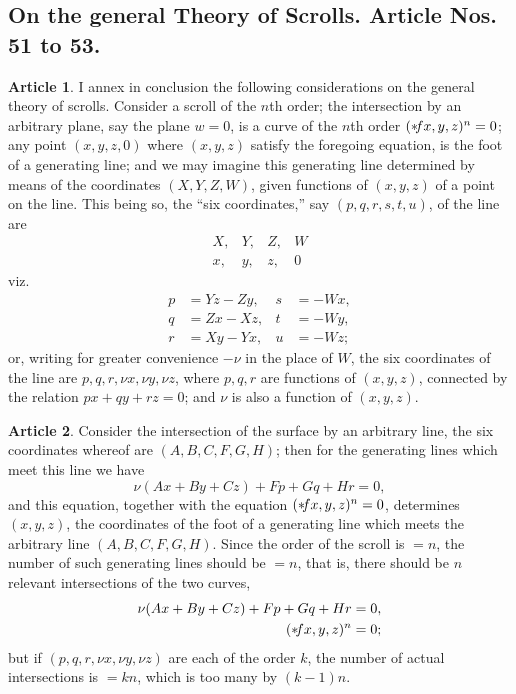 \documentclass[12pt,a4paper]{article}
\theoremstyle{definition}
\newtheorem{art}{Article}[section]
\begin{document}
\subsection*{On the general Theory of Scrolls. Article Nos. 51 to 53.}

\begin{art}
I annex in conclusion the following considerations on the general theory of scrolls. Consider a scroll of the $n$th order; the intersection by an arbitrary plane, say the plane $w = 0$, is a curve of the $n$th order $(* \hspace{-2pt} fx, y, z)^n = 0$; any point $(x, y, z, 0)$ where $(x, y, z)$ satisfy the foregoing equation, is the foot of a generating line; and we may imagine this generating line determined by means of the coordinates $(X, Y, Z, W)$, given functions of $(x, y, z)$ of a point on the line. This being so, the ``six coordinates,'' say $(p, q, r, s, t, u)$, of the line are
\[
\begin{array}{cccc}
X, & Y, & Z, & W \\
x, & y, & z, & 0
\end{array}
\]
viz.
\begin{align*}
p &= Yz - Zy, & s &= -Wx, \\
q &= Zx - Xz, & t &= -Wy, \\
r &= Xy - Yx, & u &= -Wz;
\end{align*}
or, writing for greater convenience $-\nu$ in the place of $W$, the six coordinates of the line are $p, q, r, \nu x, \nu y, \nu z$, where $p, q, r$ are functions of $(x, y, z)$, connected by the relation $px + qy + rz = 0$; and $\nu$ is also a function of $(x, y, z)$.
\end{art}

\begin{art}
Consider the intersection of the surface by an arbitrary line, the six coordinates whereof are $(A, B, C, F, G, H)$; then for the generating lines which meet this line we have
\[
\nu(Ax + By + Cz) + Fp + Gq + Hr = 0,
\]
and this equation, together with the equation $(* \hspace{-2pt} fx, y, z)^n = 0$, determines $(x, y, z)$, the coordinates of the foot of a generating line which meets the arbitrary line $(A, B, C, F, G, H)$. Since the order of the scroll is $= n$, the number of such generating lines should be $= n$, that is, there should be $n$ relevant intersections of the two curves,
\begin{align*}
\nu(Ax + By + Cz) + Fp + Gq + Hr &= 0, \\
(* \hspace{-2pt} fx, y, z)^n &= 0;
\end{align*}
but if $(p, q, r, \nu x, \nu y, \nu z)$ are each of the order $k$, the number of actual intersections is $= kn$, which is too many by $(k - 1)n$.
\end{art}
\end{document}
